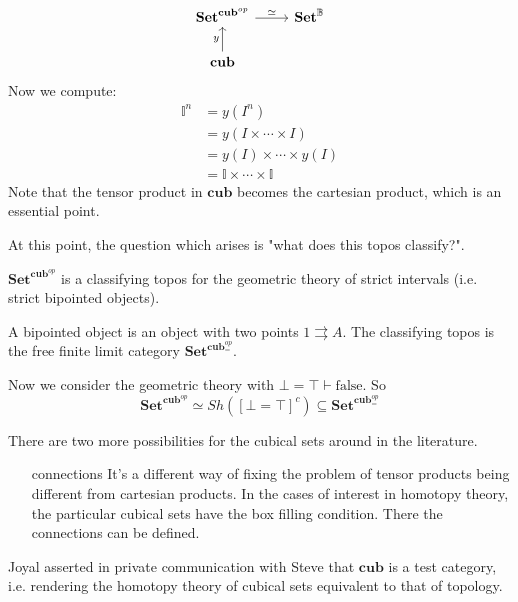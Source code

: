 \documentclass{article}
\newcommand{\ccub}{\mathbf{cub}}
\begin{document}
\begin{equation*}
\begin{tikzcd}
\mathbf{Set}^{\ccub^{op}} \arrow[r,"\simeq"] & \mathbf{Set}^{\mathbb{B}}
\\
\ccub \arrow[u,"y"]
\end{tikzcd}
\end{equation*}
Now we compute:
\begin{align*}
\mathbb{I}^n & = y(I^n) \\
& = y(I\times\cdots \times I)\\
& = y(I)\times\cdots\times y(I)\\
& = \mathbb{I}\times\cdots\times\mathbb{I}
\end{align*}
Note that the tensor product in $\ccub$ becomes the cartesian product, which
is an essential point.

At this point, the question which arises is "what does this topos classify?".

\begin{lem}
$\mathbf{Set}^{\ccub^{op}}$ is a classifying topos for the geometric theory
of strict intervals (i.e. strict bipointed objects). 

A bipointed object is an object with two points $1\rightrightarrows A$. The
classifying topos is the free finite limit category $\mathbf{Set}^{\ccub^{op}_{=}}$.

Now we consider the geometric theory with $\bot=\top\vdash\mathrm{false}$. 
So
\begin{equation*}
\mathbf{Set}^{\ccub^{op}}\simeq Sh([\bot=\top]^c)\subseteq \mathbf{Set}^{\ccub^{op}_{=}}
\end{equation*}
\end{lem}

There are two more possibilities for the cubical sets around in the literature.

\begin{enumerate}
\item[connections] It's a different way of fixing the problem of tensor products
being different from cartesian products. In the cases of interest in homotopy
theory, the particular cubical sets have the box filling condition. There the
connections can be defined. 
\end{enumerate}

\begin{lem}
Joyal asserted in private communication with Steve that $\ccub$ is a test category,
i.e. rendering the homotopy theory of cubical sets equivalent to that of topology.
\end{lem}
\end{document}
